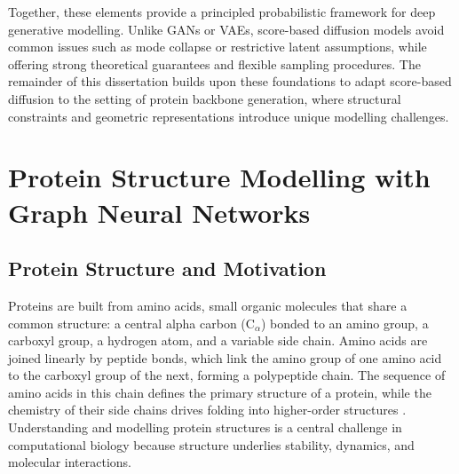 \documentclass[a4paper,12pt]{article}
\begin{document}
Together, these elements provide a principled probabilistic framework for deep generative modelling. Unlike GANs or VAEs, score-based diffusion models avoid common issues such as mode collapse or restrictive latent assumptions, while offering strong theoretical guarantees and flexible sampling procedures. The remainder of this dissertation builds upon these foundations to adapt score-based diffusion to the setting of protein backbone generation, where structural constraints and geometric representations introduce unique modelling challenges.

\clearpage

\section{Protein Structure Modelling with Graph Neural Networks}\label{sec:protein-gnn}
\subsection{Protein Structure and Motivation}\label{subsec:protein-structure}
Proteins are built from amino acids, small organic molecules that share a common structure: a central alpha carbon (C\(_\alpha\)) bonded to an amino group, a carboxyl group, a hydrogen atom, and a variable side chain. Amino acids are joined linearly by peptide bonds, which link the amino group of one amino acid to the carboxyl group of the next, forming a polypeptide chain. The sequence of amino acids in this chain defines the primary structure of a protein, while the chemistry of their side chains drives folding into higher-order structures \citep{creighton1993proteins,branden2012IntroductionProteinStructure}. Understanding and modelling protein structures is a central challenge in computational biology because structure underlies stability, dynamics, and molecular interactions.
\end{document}
